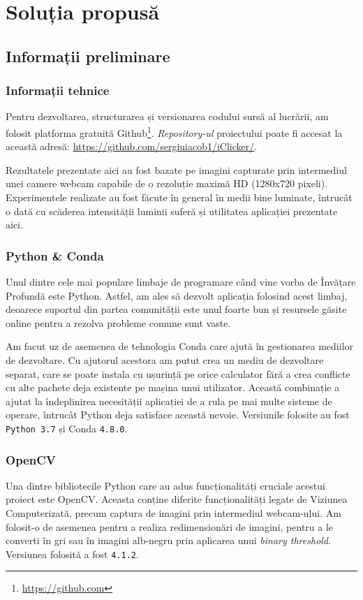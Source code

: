 \chapter{Soluția propusă}
\label{chapter2}
\section{Informații preliminare}
\subsection{Informații tehnice}
Pentru dezvoltarea, structurarea și versionarea codului sursă al lucrării, am folosit platforma gratuită Github\footnote{\url{https://github.com}}.
\emph{Repository-ul} proiectului poate fi accesat la această adresă: \url{https://github.com/sergiuiacob1/iClicker/}.

Rezultatele prezentate aici au fost bazate pe imagini capturate prin intermediul unei camere webcam capabile de o rezoluție maximă HD (1280x720 pixeli).
Experimentele realizate au fost făcute în general în medii bine luminate, întrucât o dată cu scăderea intensității luminii suferă și utilitatea aplicației prezentate aici.

\subsection{Python \& Conda}
Unul dintre cele mai populare limbaje de programare când vine vorba de Învățare Profundă este Python.
Astfel, am ales să dezvolt aplicația folosind acest limbaj, deoarece suportul din partea comunității este unul foarte bun și resursele găsite online pentru a rezolva probleme comune sunt vaste.

Am facut uz de asemenea de tehnologia Conda care ajută în gestionarea mediilor de dezvoltare.
Cu ajutorul acestora am putut crea un mediu de dezvoltare separat, care se poate instala cu ușurință pe orice calculator fără a crea conflicte cu alte pachete deja existente pe mașina unui utilizator.
Această combinație a ajutat la îndeplinirea necesității aplicației de a rula pe mai multe sisteme de operare, întrucât Python deja satisface această nevoie.
Versiunile folosite au fost \lstinline{Python 3.7} și Conda \lstinline{4.8.0}.

\subsection{OpenCV}
Una dintre bibliotecile Python care au adus funcționalități cruciale acestui proiect este OpenCV.
Aceasta conține diferite funcționalități legate de Viziunea Computerizată, precum captura de imagini prin intermediul webcam-ului.
Am folosit-o de asemenea pentru a realiza redimensionări de imagini, pentru a le converti în gri sau în imagini alb-negru prin aplicarea unui \emph{binary threshold}.
Versiunea folosită a fost \lstinline{4.1.2}.

